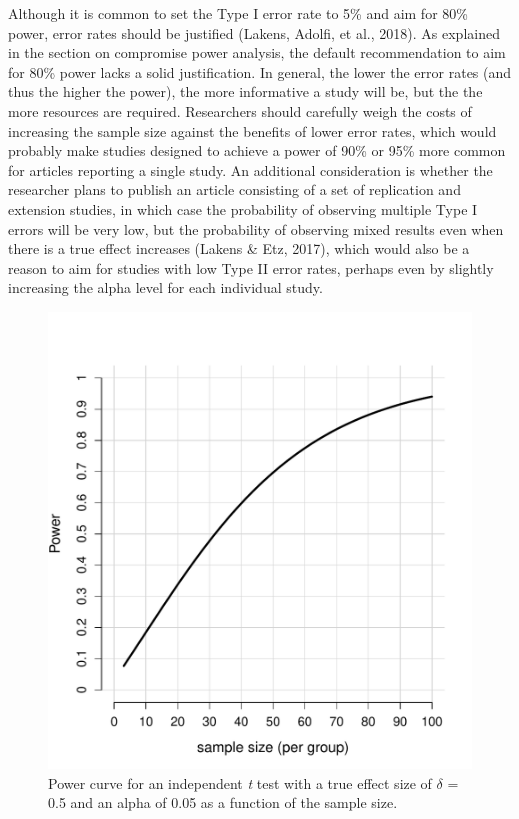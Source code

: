 \documentclass[
  english,
  ,jou, a4paper,floatsintext]{apa6}
\begin{document}
Although it is common to set the Type I error rate to 5\% and aim for 80\% power, error rates should be justified (Lakens, Adolfi, et al., 2018). As explained in the section on compromise power analysis, the default recommendation to aim for 80\% power lacks a solid justification. In general, the lower the error rates (and thus the higher the power), the more informative a study will be, but the the more resources are required. Researchers should carefully weigh the costs of increasing the sample size against the benefits of lower error rates, which would probably make studies designed to achieve a power of 90\% or 95\% more common for articles reporting a single study. An additional consideration is whether the researcher plans to publish an article consisting of a set of replication and extension studies, in which case the probability of observing multiple Type I errors will be very low, but the probability of observing mixed results even when there is a true effect increases (Lakens \& Etz, 2017), which would also be a reason to aim for studies with low Type II error rates, perhaps even by slightly increasing the alpha level for each individual study.

\begin{figure}
\centering
\includegraphics{sample_size_justification_files/figure-latex/power-2-1.pdf}
\caption{\label{fig:power-2}Power curve for an independent \emph{t} test with a true effect size of \(\delta\) = 0.5 and an alpha of 0.05 as a function of the sample size.}
\end{figure}
\end{document}
